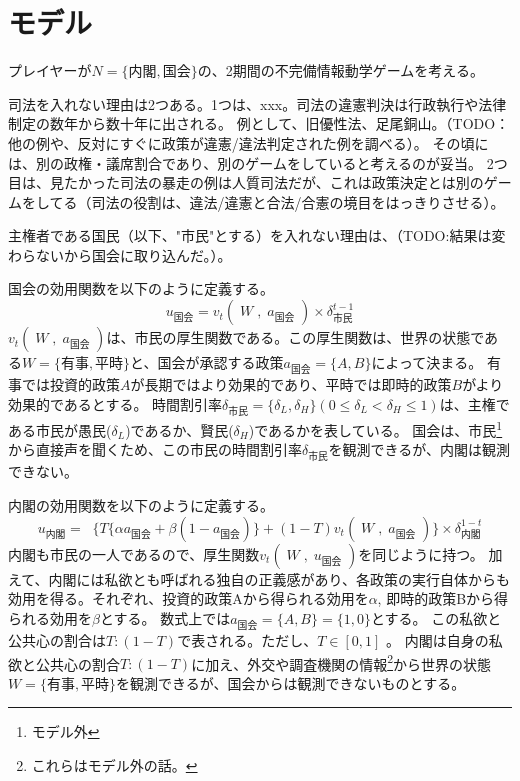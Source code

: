 \documentclass[main.tex]{subfiles}
\begin{document}
\section{モデル}

プレイヤーが$N=\lbrace 内閣, 国会 \rbrace$の、2期間の不完備情報動学ゲームを考える。



司法を入れない理由は2つある。1つは、xxx。司法の違憲判決は行政執行や法律制定の数年から数十年に出される。
例として、旧優性法、足尾銅山。（TODO：他の例や、反対にすぐに政策が違憲/違法判定された例を調べる）。
その頃には、別の政権・議席割合であり、別のゲームをしていると考えるのが妥当。
2つ目は、見たかった司法の暴走の例は人質司法だが、これは政策決定とは別のゲームをしてる（司法の役割は、違法/違憲と合法/合憲の境目をはっきりさせる）。

主権者である国民（以下、"市民"とする）を入れない理由は、（TODO:結果は変わらないから国会に取り込んだ。）。


国会の効用関数を以下のように定義する。
$$u_\text{国会} = v_t(\;W\;,\; a_\text{国会}\;) × \delta^{t-1}_\text{市民}$$
$v_t(\;W\;,\; a_\text{国会}\;)$は、市民の厚生関数である。この厚生関数は、世界の状態である$W=\lbrace 有事, 平時\rbrace$と、国会が承認する政策$a_{国会}=\lbrace A, B\rbrace$によって決まる。
有事では投資的政策$A$が長期ではより効果的であり、平時では即時的政策$B$がより効果的であるとする。
時間割引率$\delta_{市民}=\lbrace \delta_L, \delta_H \rbrace (0\le \delta_L<\delta_H \le 1)$は、主権である市民が愚民($\delta_L$)であるか、賢民($\delta_H$)であるかを表している。
国会は、市民\footnote{モデル外}から直接声を聞くため、この市民の時間割引率$\delta_{市民}$を観測できるが、内閣は観測できない。

内閣の効用関数を以下のように定義する。
$$ u_\text{内閣} =\;\; \lbrace T\lbrace \alpha a_\text{国会} + \beta (1-a_\text{国会}) \rbrace  + (1-T)v_t(\;W\;,\; a_\text{国会}\;) \rbrace × \delta^{1-t}_{内閣}$$
内閣も市民の一人であるので、厚生関数$v_t(\;W\;,\; u_\text{国会}\;)$を同じように持つ。
加えて、内閣には私欲とも呼ばれる独自の正義感があり、各政策の実行自体からも効用を得る。それぞれ、投資的政策Aから得られる効用を$\alpha$, 即時的政策Bから得られる効用を$\beta$とする。
数式上では$a_{国会}=\lbrace A, B\rbrace = \lbrace 1,0\rbrace$とする。
この私欲と公共心の割合は$T:(1-T)$で表される。ただし、$T\in[0,1]$ 。
内閣は自身の私欲と公共心の割合$T:(1-T)$に加え、外交や調査機関の情報\footnote{これらはモデル外の話。}から世界の状態$W=\lbrace 有事, 平時\rbrace$を観測できるが、国会からは観測できないものとする。
\end{document}
